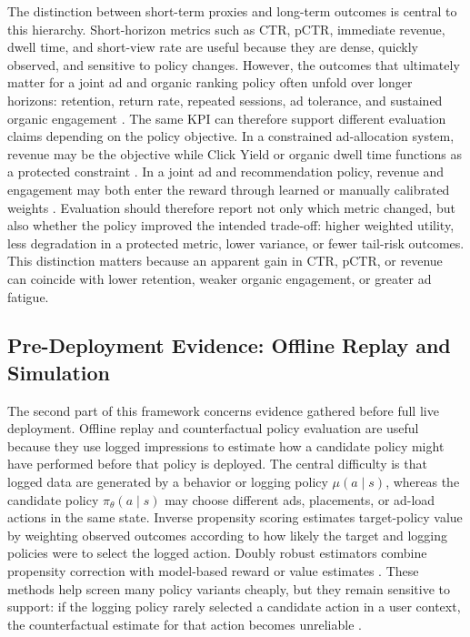 \documentclass[manuscript,review,screen]{acmart}
\begin{document}
The distinction between short-term proxies and long-term outcomes is central to this hierarchy. Short-horizon metrics such as CTR, pCTR, immediate revenue, dwell time, and short-view rate are useful because they are dense, quickly observed, and sensitive to policy changes. However, the outcomes that ultimately matter for a joint ad and organic ranking policy often unfold over longer horizons: retention, return rate, repeated sessions, ad tolerance, and sustained organic engagement \cite{hohnhold2015focusing, wang2022surrogate, mcdonald2023impatient}. The same KPI can therefore support different evaluation claims depending on the policy objective. In a constrained ad-allocation system, revenue may be the objective while Click Yield or organic dwell time functions as a protected constraint \cite{zhang2018whole, yan2020ads}. In a joint ad and recommendation policy, revenue and engagement may both enter the reward through learned or manually calibrated weights \cite{zhao2020jointly, zhao2021dear}. Evaluation should therefore report not only which metric changed, but also whether the policy improved the intended trade-off: higher weighted utility, less degradation in a protected metric, lower variance, or fewer tail-risk outcomes. This distinction matters because an apparent gain in CTR, pCTR, or revenue can coincide with lower retention, weaker organic engagement, or greater ad fatigue.

\subsection{Pre-Deployment Evidence: Offline Replay and Simulation}
\label{subsec:offline-simulated-evaluation}

The second part of this framework concerns evidence gathered before full live deployment. Offline replay and counterfactual policy evaluation are useful because they use logged impressions to estimate how a candidate policy might have performed before that policy is deployed. The central difficulty is that logged data are generated by a behavior or logging policy $\mu(a \mid s)$, whereas the candidate policy $\pi_\theta(a \mid s)$ may choose different ads, placements, or ad-load actions in the same state. Inverse propensity scoring estimates target-policy value by weighting observed outcomes according to how likely the target and logging policies were to select the logged action. Doubly robust estimators combine propensity correction with model-based reward or value estimates \cite{swaminathan2015counterfactual, dudik2011doubly}. These methods help screen many policy variants cheaply, but they remain sensitive to support: if the logging policy rarely selected a candidate action in a user context, the counterfactual estimate for that action becomes unreliable \cite{levine2020offline, chen2022off}.
\end{document}
